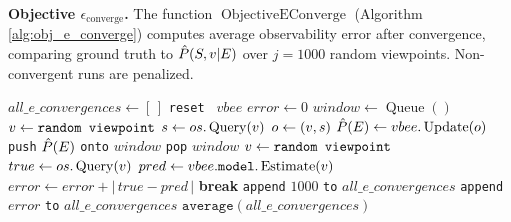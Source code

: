 \noindent\textbf{Objective \(\epsilon_{\text{converge}}\).} The function \(\operatorname{ObjectiveEConverge}\) (Algorithm \ref{alg:obj_e_converge}) computes average observability error after convergence, comparing ground truth to \(\estpsge\) over \(j=1000\) random viewpoints. Non-convergent runs are penalized.

\begin{singlespace}
\begin{algorithm}[H]
    \caption[Objective Function: $\epsilon_{\text{converge}}$]{ObjectiveEConverge}
    \label{alg:obj_e_converge}
    \begin{algorithmic}
            \State $all\_e\_convergences \gets [\,]$
                \State \texttt{reset } $vbee$
                \State $error \gets 0$
                \State $window \gets \operatorname{Queue}()$
                    \State $v \gets \texttt{random viewpoint}$
                    \State $s \gets os.\operatorname{Query}(v)$
                    \State $o \gets (v,s)$
                    \State $\hat{P}(E) \gets vbee.\operatorname{Update}(o)$
                    \State \texttt{push} $\hat{P}(E)$ \texttt{onto} $window$
                        \State \texttt{pop} $window$
                                \State $v \gets \texttt{random viewpoint}$
                                \State $true \gets os.\operatorname{Query}(v)$
                                \State $pred \gets vbee.\texttt{model}.\operatorname{Estimate}(v)$ \Comment{\(\estpsge\)}
                                \State $error \gets error + |\,true - pred\,|$
                            \EndFor
                            \State \textbf{break}
                        \EndIf
                    \EndIf
                \EndFor
                    \State \texttt{append} $1000$ \texttt{to} $all\_e\_convergences$
                \Else
                    \State \texttt{append} $error$ \texttt{to} $all\_e\_convergences$
                \EndIf
            \EndFor
            \State \Return $\texttt{average}(all\_e\_convergences)$
        \EndFunction
    \end{algorithmic}
\end{algorithm}
\end{singlespace}

